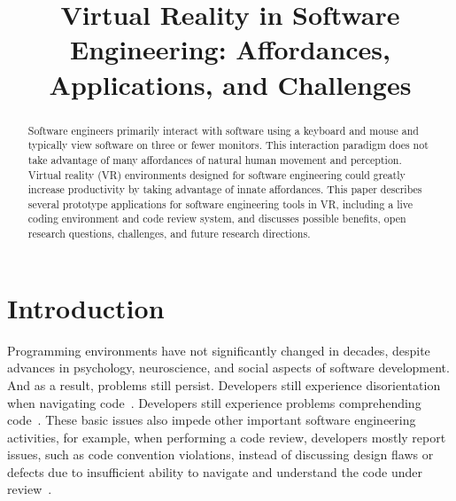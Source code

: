 \documentclass[conference]{IEEEtran}
\begin{document}
\title{Virtual Reality in Software Engineering: Affordances, Applications, and Challenges}

\author{
\and
{}
\and
{}
}

\maketitle
\begin{abstract}
Software engineers primarily interact with software using a keyboard and mouse and typically view software on three or fewer monitors.
This interaction paradigm does not take advantage of many affordances of natural human movement and perception.
Virtual reality (VR) environments designed for software engineering could greatly increase productivity by taking advantage of innate affordances.
This paper describes several prototype applications for software engineering tools in VR, including a live coding environment and code review system, and discusses possible benefits, open research questions, challenges, and future research directions.
\end{abstract}

\section{Introduction}

Programming environments have not significantly changed in decades, 
despite advances in psychology, neuroscience, and social aspects of software development.
And as a result, problems still persist.  Developers still experience disorientation when navigating code~\cite{Henley:2014}.
Developers still experience problems comprehending code~\cite{Maalej:TOSEM:2014}.  These basic issues also impede other important software engineering activities, for example,
when performing a code review, developers mostly report issues, such as code convention violations, instead of discussing design flaws or defects
due to insufficient ability to navigate and understand the code under review~\cite{bacchelli:ModernCodeReviewChallenges}.  
\end{document}
